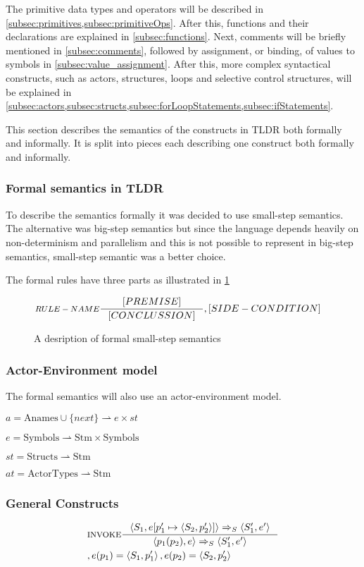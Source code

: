 The primitive data types and operators will be described in \cref{subsec:primitives,subsec:primitiveOps}. After this, functions and their declarations are explained in \cref{subsec:functions}. Next, comments will be briefly mentioned in \cref{subsec:comments}, followed by assignment, or binding, of values to symbols in \cref{subsec:value_assignment}. After this, more complex syntactical constructs, such as actors, structures, loops and selective control structures, will be explained in \cref{subsec:actors,subsec:structs,subsec:forLoopStatements,subsec:ifStatements}.

This section describes the semantics of the constructs in TLDR both formally and informally. It is split into pieces each describing one construct both formally and informally.

\subsubsection{Formal semantics in TLDR}
To describe the semantics formally it was decided to use small-step semantics. The alternative was big-step semantics but since the language depends heavily on non-determinism and parallelism and this is not possible to represent in big-step semantics, small-step semantic was a better choice.

The formal rules have three parts as illustrated in \cref{SS-semantics}

\begin{figure}[H]
\begin{align*}
&\inference[$RULE-NAME$]{[PREMISE]}
												{[CONCLUSSION]}
												{,[SIDE-CONDITION]}
\end{align*}
\caption{A desription of formal small-step semantics}
\label{SS-semantics}
\end{figure}

\subsubsection{Actor-Environment model}
The formal semantics will also use an actor-environment model.

$a = \text{Anames} \cup \{next\} \rightharpoonup e \times st$

$e = \text{Symbols} \rightharpoonup \text{Stm} \times \text{Symbols}$

$st = \text{Structs} \rightharpoonup \text{Stm}$

$at = \text{ActorTypes} \rightharpoonup \text{Stm}$

\subsubsection{General Constructs}
\begin{align*}
&\inference[$\text{INVOKE}$]{\Braket{S_1,e[p_1' \mapsto \Braket{S_2,p_2'}]} \Rightarrow_S \Braket{S_1',e'}}
                  {\Braket{p_1(p_2),e} \Rightarrow_S \Braket{S_1',e'}}
\\
&									{,e(p_1) = \Braket{S_1,p_1'}, e(p_2) = \Braket{S_2,p_2'}}
\end{align*}